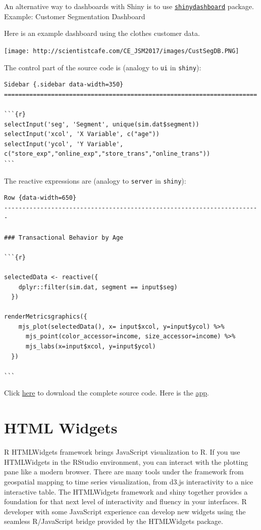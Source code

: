 \documentclass[]{book}
\theoremstyle{definition}
\theoremstyle{definition}
\theoremstyle{remark}
\begin{document}
An alternative way to dashboards with Shiny is to use
\href{https://rstudio.github.io/shinydashboard/}{\texttt{shinydashboard}}
package. Example: Customer Segmentation Dashboard

Here is an example dashboard using the clothes customer data.

\texttt{[image: http://scientistcafe.com/CE\_JSM2017/images/CustSegDB.PNG]}

The control part of the source code is (analogy to \texttt{ui} in
\texttt{shiny}):

\begin{verbatim}
Sidebar {.sidebar data-width=350}
======================================================================

```{r}
selectInput('seg', 'Segment', unique(sim.dat$segment))
selectInput('xcol', 'X Variable', c("age"))
selectInput('ycol', 'Y Variable', c("store_exp","online_exp","store_trans","online_trans"))
```
\end{verbatim}

The reactive expressions are (analogy to \texttt{server} in
\texttt{shiny}):

\begin{verbatim}
Row {data-width=650}
-----------------------------------------------------------------------

### Transactional Behavior by Age

```{r}

selectedData <- reactive({
    dplyr::filter(sim.dat, segment == input$seg)
  })
  
renderMetricsgraphics({
    mjs_plot(selectedData(), x= input$xcol, y=input$ycol) %>%
      mjs_point(color_accessor=income, size_accessor=income) %>%
      mjs_labs(x=input$xcol, y=input$ycol)
  })

```
\end{verbatim}

Click
\href{https://raw.githubusercontent.com/happyrabbit/linhui.org/gh-pages/CE_JSM2017/Examples/segmentdb.Rmd}{here}
to download the complete source code. Here is the
\href{https://scientistcafe.shinyapps.io/shinysample/}{app}.

\section{HTML Widgets}\label{html-widgets-1}

R HTMLWidgets framework brings JavaScript visualization to R. If you use
HTMLWidgets in the RStudio environment, you can interact with the
plotting pane like a modern browser. There are many tools under the
framework from geospatial mapping to time series visualization, from
d3.js interactivity to a nice interactive table. The HTMLWidgets
framework and shiny together provides a foundation for that next level
of interactivity and fluency in your interfaces. R developer with some
JavaScript experience can develop new widgets using the seamless
R/JavaScript bridge provided by the HTMLWidgets package.
\end{document}
